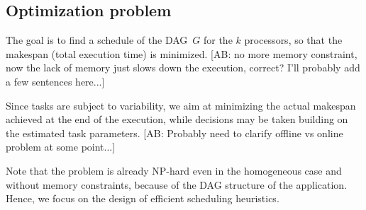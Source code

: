 \documentclass[conference]{IEEEtran}
\newcommand{\skug}[1]{{\color{blue}[SK: #1]}}
\newcommand{\hmey}[1]{{\color{red}[HM: #1]}}
\newcommand{\AB}[1]{{\color{purple}[AB: #1]}}
\begin{document}
\subsection{Optimization problem}
\label{sec.mod.pb}

The goal is to find a schedule of the DAG~$G$ for the $k$ processors,
so that the makespan (total execution time) is minimized. 
\AB{no more memory constraint, now the lack of memory just slows down the execution, correct?
I'll probably add a few sentences here...}

Since tasks are subject to variability, we aim at minimizing the actual makespan
achieved at the end of the execution, while decisions may be taken building
on the estimated task parameters.
\AB{Probably need to clarify offline vs online problem at some point...}

Note that the problem is already NP-hard even in the homogeneous case and 
without memory constraints, because of the DAG structure of the application. 
Hence, we focus on the design of efficient scheduling heuristics. 
\end{document}
